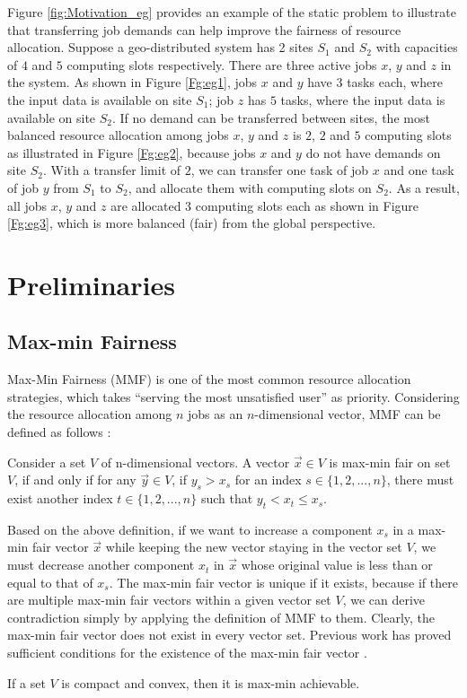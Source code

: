 Figure \ref{fig:Motivation_eg} provides an example of the static problem to illustrate that transferring job demands can help improve the fairness of resource allocation. Suppose a geo-distributed system has 2 sites $S_1$ and $S_2$ with capacities of $4$ and $5$ computing slots respectively. There are three active jobs $x$, $y$ and $z$ in the system. As shown in Figure \ref{Fg:eg1}, jobs $x$ and $y$ have $3$ tasks each, where the input data is available on site $S_1$; job $z$ has $5$ tasks, where the input data is available on site $S_2$. If no demand can be transferred between sites, the most balanced resource allocation among jobs $x$, $y$ and $z$ is $2$, $2$ and $5$ computing slots as illustrated in Figure \ref{Fg:eg2}, because jobs $x$ and $y$ do not have demands on site $S_2$. With a transfer limit of $2$, we can transfer one task of job $x$ and one task of job $y$ from $S_1$ to $S_2$, and allocate them with computing slots on $S_2$. As a result, all jobs $x$, $y$ and $z$ are allocated $3$ computing slots each as shown in Figure \ref{Fg:eg3}, which is more balanced (fair) from the global perspective.


\section{Preliminaries}
\label{sec3:prelim}
\subsection{Max-min Fairness}
Max-Min Fairness (MMF) is one of the most common resource allocation strategies, which takes ``serving the most unsatisfied user'' as priority. Considering the resource allocation among $n$ jobs as an $n$-dimensional vector, MMF can be defined as follows \cite{radunovic2007unified}:

\begin{definition}
    \label{def:MMF}
    Consider a set $V$ of n-dimensional vectors. A vector $\vec x \in V$ is max-min fair on set $V$, if and only if for any $\vec y \in V$, if $y_s > x_s$ for an index $s \in \{1, 2, ..., n\}$, there must exist another index $t \in \{1, 2, ..., n\}$ such that $y_t < x_t \leq x_s$.
\end{definition}

Based on the above definition, if we want to increase a component $x_s$ in a max-min fair vector $\vec x$ while keeping the new vector staying in the vector set $V$, we must decrease another component $x_t$ in $\vec x$ whose original value is less than or equal to that of $x_s$. The max-min fair vector is unique if it exists, because if there are multiple max-min fair vectors within a given vector set $V$, we can derive contradiction simply by applying the definition of MMF to them. Clearly, the max-min fair vector does not exist in every vector set. Previous work has proved sufficient conditions for the existence of the max-min fair vector \cite{radunovic2007unified}. 
\begin{theorem}
    If a set $V$ is compact and convex, then it is max-min achievable.
\label{the:achievable}
\end{theorem}

